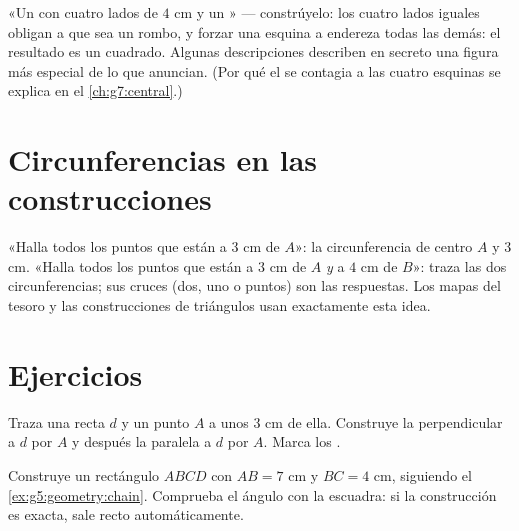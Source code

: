 \begin{example}\label{ex:g5:geometry:recognize}
«Un  con cuatro lados de $4$ cm y un » ---
constrúyelo: los cuatro lados iguales obligan a que sea un rombo, y forzar
una esquina a  endereza todas las demás: el resultado
es un cuadrado. Algunas descripciones describen en secreto una figura más especial
de lo que anuncian. (Por qué el  se contagia a las cuatro
esquinas se explica en el \cref{ch:g7:central}.)
\end{example}

\section{Circunferencias en las construcciones}

\begin{example}\label{ex:g5:geometry:circle}
«Halla todos los puntos que están a $3$ cm de $A$»: la circunferencia de centro $A$ y
 $3$ cm. «Halla todos los puntos que están a $3$ cm de $A$ \emph{y} a
$4$ cm de $B$»: traza las dos circunferencias; sus cruces (dos, uno o
 puntos) son las respuestas. Los mapas del tesoro y las construcciones de
triángulos usan exactamente esta idea.
\end{example}

\section{Ejercicios}

\begin{exercise}[$\star$]\label{exo:g5:geometry:1}
Traza una recta $d$ y un punto $A$ a unos $3$ cm de ella. Construye
la perpendicular a $d$ por $A$ y después la paralela a $d$
por $A$. Marca los .
\end{exercise}

\begin{exercise}[$\star$]\label{exo:g5:geometry:2}
Construye un rectángulo $ABCD$ con $AB = 7$ cm y $BC = 4$ cm,
siguiendo el \cref{ex:g5:geometry:chain}. Comprueba el  ángulo con
la escuadra: si la construcción es exacta, sale recto
automáticamente.
\end{exercise}

